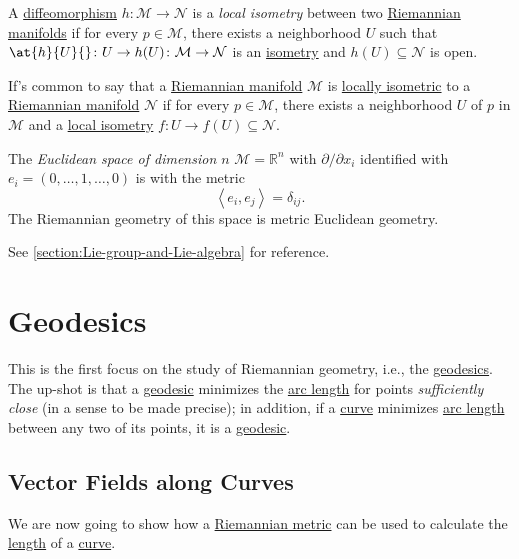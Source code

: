 \begin{definition}\label{def:local-isometry}
	A \hyperref[def:diffeomorphism]{diffeomorphism} \(h\colon \mathcal{M} \to \mathcal{N} \) is a \emph{local isometry} between two \hyperref[def:Riemannian-manifold]{Riemannian manifolds} if for every \(p\in \mathcal{M} \), there exists a neighborhood \(U\) such that \(\at{h}{U}{} \colon U \to h(U)\colon \mathcal{M} \to \mathcal{N} \) is an \hyperref[def:isometry]{isometry} and \(h(U) \subseteq \mathcal{N} \) is open.
\end{definition}

If's common to say that a \hyperref[def:Riemannian-manifold]{Riemannian manifold} \(\mathcal{M} \) is \hyperref[def:local-isometry]{locally isometric} to a \hyperref[def:Riemannian-manifold]{Riemannian manifold} \(\mathcal{N} \) if for every \(p\in \mathcal{M} \), there exists a neighborhood \(U\) of \(p\) in \(\mathcal{M} \) and a \hyperref[def:local-isometry]{local isometry} \(f\colon U \to f(U) \subseteq \mathcal{N} \).

\begin{eg}
	The \emph{Euclidean space of dimension \(n\)} \(\mathcal{M} = \mathbb{R} ^n\) with \(\partial /\partial x_i\) identified with \(e_i =(0, \ldots , 1, \ldots , 0)\) is with the metric
	\[
		\left\langle e_i, e_j \right\rangle = \delta _{ij}.
	\]
	The Riemannian geometry of this space is metric Euclidean geometry.
\end{eg}

\begin{eg}
	See \autoref{section:Lie-group-and-Lie-algebra} for reference.
\end{eg}

\section{Geodesics}
This is the first focus on the study of Riemannian geometry, i.e., the \hyperref[def:geodesic]{geodesics}. The up-shot is that a \hyperref[def:geodesic]{geodesic} minimizes the \hyperref[def:length]{arc length} for points \emph{sufficiently close} (in a sense to be made precise); in addition, if a \hyperref[def:curve]{curve} minimizes \hyperref[def:length]{arc length} between any two of its points, it is a \hyperref[def:geodesic]{geodesic}.

\subsection{Vector Fields along Curves}
We are now going to show how a \hyperref[def:Riemannian-metric]{Riemannian metric} can be used to calculate the \hyperref[def:length]{length} of a \hyperref[def:curve]{curve}.

